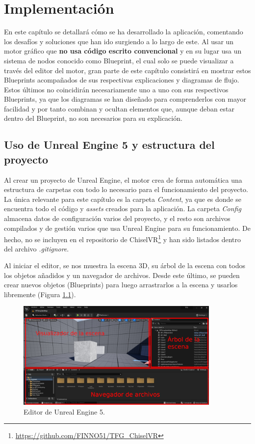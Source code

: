 \chapter{Implementación}

En este capítulo se detallará cómo se ha desarrollado la aplicación, comentando los desafíos y soluciones que han ido surgiendo a lo largo de este. Al usar un motor gráfico que \textbf{no usa código escrito convencional} y en su lugar usa un sistema de nodos conocido como Blueprint, el cual solo se puede visualizar a través del editor del motor, gran parte de este capítulo consistirá en mostrar estos Blueprints acompañados de sus respectivas explicaciones y diagramas de flujo. Estos últimos no coincidirán necesariamente uno a uno con sus respectivos Blueprints, ya que los diagramas se han diseñado para comprenderlos con mayor facilidad y por tanto combinan y ocultan elementos que, aunque deban estar dentro del Blueprint, no son necesarios para su explicación.

\section{Uso de Unreal Engine 5 y estructura del proyecto}

Al crear un proyecto de Unreal Engine, el motor crea de forma automática una estructura de carpetas con todo lo necesario para el funcionamiento del proyecto. La única relevante para este capítulo es la carpeta \textit{Content}, ya que es donde se encuentra todo el código y \textit{assets} creados para la aplicación. La carpeta \textit{Config} almacena datos de configuración varios del proyecto, y el resto son archivos compilados y de gestión varios que usa Unreal Engine para su funcionamiento. De hecho, no se incluyen en el repositorio de ChiselVR\footnote{\url{https://github.com/FINNO51/TFG_ChiselVR}} y han sido listados dentro del archivo \textit{.gitignore}.

Al iniciar el editor, se nos muestra la escena 3D, su árbol de la escena con todos los objetos añadidos y un navegador de archivos. Desde este último, se pueden crear nuevos objetos (Blueprints) para luego arrastrarlos a la escena y usarlos libremente (Figura \ref{fig:unrealinicio}).

\begin{figure}[H]
	\centering
	\includegraphics[width=10cm]{imagenes/unrealinicio}
	\caption{Editor de Unreal Engine 5.}
	\label{fig:unrealinicio}
\end{figure}

